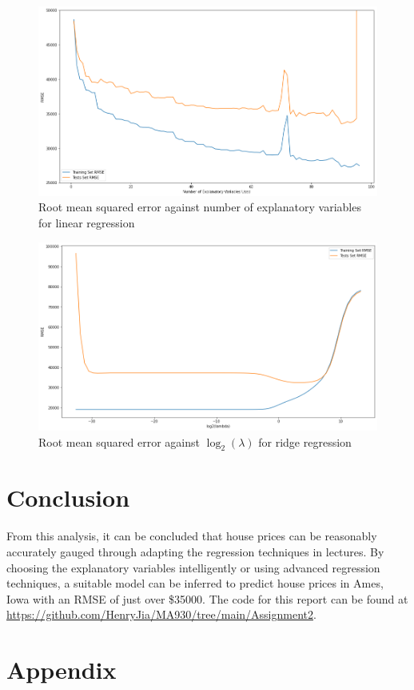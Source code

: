 \documentclass[10pt, twoside]{article}
\begin{document}
\begin{figure}[H]
\includegraphics[width=12cm]{corr1}
\centering
\caption{Root mean squared error against number of explanatory variables for linear regression}
\end{figure}

\begin{figure}[H]
\includegraphics[width=12cm]{ridge}
\centering
\caption{Root mean squared error against $\log_2(\lambda)$ for ridge regression}
\end{figure}

\section{Conclusion}

From this analysis, it can be concluded that house prices can be reasonably accurately gauged through adapting the regression techniques in lectures. By choosing the explanatory variables intelligently or using advanced regression techniques, a suitable model can be inferred to predict house prices in Ames, Iowa with an RMSE of just over \$35000. The code for this report can be found at \url{https://github.com/HenryJia/MA930/tree/main/Assignment2}.

\appendix
\section{Appendix}
\end{document}
